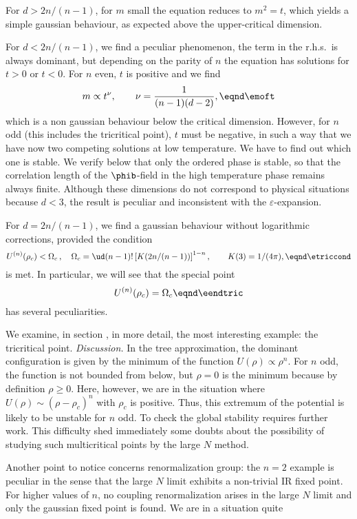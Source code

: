 For $d>2n/(n-1)$, for $m$ small the equation reduces to $m^2=t$, which yields a simple gaussian behaviour, as expected above the upper-critical dimension. \par
For $d<2n/(n-1)$, we find a peculiar phenomenon, the term in the r.h.s.\ is
always dominant, but depending on the parity of $n$ the equation has solutions
for $t>0$ or $t<0$. For $n$ even, $t$ is positive and we find
$$m\propto t^\nu,\qquad \nu={1\over(n-1)(d-2)},\eqnd\emoft$$
which is a non gaussian behaviour below the critical dimension.
However, for $n$ odd (this includes the tricritical point), $t$ must be
negative,
in such a way that we have now two competing solutions at low temperature.
We have to find out which one is stable. We verify below that only the
ordered phase is stable, so that the correlation length of the $\phib$-field
in the high temperature phase remains always finite. Although these dimensions
do not correspond to physical situations because $d<3$, the result is
peculiar and inconsistent with the $\varepsilon$-expansion.
\par
For $d=2n/(n-1)$, we find a gaussian behaviour without logarithmic
corrections, provided the condition
$$U^{(n)}(\rho_c)< \Omega _c\,,\quad \Omega _c=\ud(n-1)! \left[K(2n/(n-1))\right]^{1-n},\qquad
K(3)=1/(4\pi),\eqnd\etriccond$$
is met. In particular, we will see that the special point
$$ U^{(n)}(\rho_c) =\Omega _c
\eqnd\eendtric$$
 has several peculiarities. \par
We examine, in section \label{\ssNtricritical}, in more detail,  the most interesting example: the tricritical point.
 \medskip
{\it Discussion.} In the tree approximation, the dominant configuration
is given by the minimum of the function $U(\rho)\propto\rho^n$. For $n$ odd,
the function is not bounded from below, but $\rho=0$
is the minimum because by
definition $\rho\ge0$. Here, however, we are in the situation where $U(\rho)
\sim (\rho-\rho_c)^n$ with $\rho_c$ is positive. Thus, this extremum of the
potential is likely to be unstable for $n$ odd. To check the global
stability requires further work. This difficulty shed immediately some doubts about the possibility of studying  such multicritical
points  by the large $N$ method.
\par
Another point to notice concerns renormalization group: the $n=2$ example is
peculiar in the sense that the large $N$ limit exhibits a non-trivial IR fixed
point. For higher values of $n$, no coupling renormalization arises in the
large $N$ limit and only the gaussian fixed point is found. We are in a
situation quite

